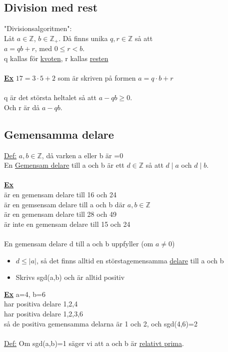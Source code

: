 \documentclass{article}
\begin{document}
    \subsection{Division med rest}
    \underline{}{"Divisionsalgoritmen":}\\
    Låt $a\in \mathbb{Z}$, $b\in \mathbb{Z_{+}}$. Då finns unika $q,r\in \mathbb{Z}$ så att\\
    \indent $a=qb+r$, med $0\leq r<b$.\\
    q kallas för \underline{kvoten}, r kallas \underline{resten}\\\\
    \underline{\textbf{Ex}} $17=3\cdot 5+2$ som är skriven på formen $a=q\cdot b+r$\\
    \\
    q är det största heltalet så att $a-qb\geq 0$.\\
    Och r är då $a-qb$.

    \subsection{Gemensamma delare}
    \underline{Def:} $a,b\in \mathbb{Z}$, då varken a eller b är =0\\
    En \underline{Gemensam delare} till a och b är ett $d\in \mathbb{Z}$ så att $d\mid a$ och $d\mid b$.\\\\
    \underline{\textbf{Ex}}\\
     är en gemensam delare till 16 och 24\\
     är en gemsensam delare till a och b där $a,b\in \mathbb{Z}$\\
     är en gemensam delare till 28 och 49\\
     är inte en gemensam delare till 15 och 24\\\\
    
    En gemensam delare d till a och b uppfyller (om $a\neq 0$)
    \begin{itemize}
        \item $d\leq |a|$, så det finns alltid en störstagemensamma \underline{delare} till a och b
        \item Skrivs sgd(a,b) och är alltid positiv
    \end{itemize}
    \underline{\textbf{Ex}} a=4, b=6\\
     har positiva delare 1,2,4\\
     har positiva delare 1,2,3,6\\
    så de positiva gemensamma delarna är 1 och 2, och sgd(4,6)=2
    \\\\
    \underline{Def:} Om sgd(a,b)=1 säger vi att a och b är \underline{relativt prima}.\\
\end{document}
